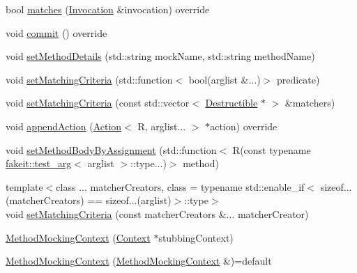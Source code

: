 \begin{DoxyCompactItemize}
\item 
bool \mbox{\hyperlink{classfakeit_1_1MethodMockingContext_a240fe9e15cffcebd52f5b0c9ccf87654}{matches}} (\mbox{\hyperlink{structfakeit_1_1Invocation}{Invocation}} \&invocation) override
\item 
void \mbox{\hyperlink{classfakeit_1_1MethodMockingContext_a68a56b3fbd0a2b654a1c72de66e68a71}{commit}} () override
\item 
void \mbox{\hyperlink{classfakeit_1_1MethodMockingContext_a108167e6800e17c71ed5bbed5fcd955a}{set\+Method\+Details}} (std\+::string mock\+Name, std\+::string method\+Name)
\item 
void \mbox{\hyperlink{classfakeit_1_1MethodMockingContext_a43555a14b32453588eb3990a7c6b9a09}{set\+Matching\+Criteria}} (std\+::function$<$ bool(arglist \&...)$>$ predicate)
\item 
void \mbox{\hyperlink{classfakeit_1_1MethodMockingContext_affc5ac50fc419a5f8b5adff8d5d02941}{set\+Matching\+Criteria}} (const std\+::vector$<$ \mbox{\hyperlink{classfakeit_1_1Destructible}{Destructible}} $\ast$ $>$ \&matchers)
\item 
void \mbox{\hyperlink{classfakeit_1_1MethodMockingContext_ad413d04564c89fe134dfb7bae1a1f2a1}{append\+Action}} (\mbox{\hyperlink{structfakeit_1_1Action}{Action}}$<$ R, arglist... $>$ $\ast$action) override
\item 
void \mbox{\hyperlink{classfakeit_1_1MethodMockingContext_ade0a1e36946f68957ee3717147122c4d}{set\+Method\+Body\+By\+Assignment}} (std\+::function$<$ R(const typename \mbox{\hyperlink{structfakeit_1_1test__arg}{fakeit\+::test\+\_\+arg}}$<$ arglist $>$\+::type...)$>$ method)
\item 
{\footnotesize template$<$class ... matcher\+Creators, class  = typename std\+::enable\+\_\+if$<$                sizeof...(matcher\+Creators) == sizeof...(arglist)$>$\+::type$>$ }\\void \mbox{\hyperlink{classfakeit_1_1MethodMockingContext_ab6bf85e9f9f5e5eeb2766ec487a42e20}{set\+Matching\+Criteria}} (const matcher\+Creators \&... matcher\+Creator)
\item 
\mbox{\hyperlink{classfakeit_1_1MethodMockingContext_aa5d0708f0a044fbc8080f64091f8aa71}{Method\+Mocking\+Context}} (\mbox{\hyperlink{structfakeit_1_1MethodMockingContext_1_1Context}{Context}} $\ast$stubbing\+Context)
\item 
\mbox{\hyperlink{classfakeit_1_1MethodMockingContext_aff21ad1769db1e3f81decc54c4b43ed3}{Method\+Mocking\+Context}} (\mbox{\hyperlink{classfakeit_1_1MethodMockingContext}{Method\+Mocking\+Context}} \&)=default

\end{DoxyCompactItemize}
